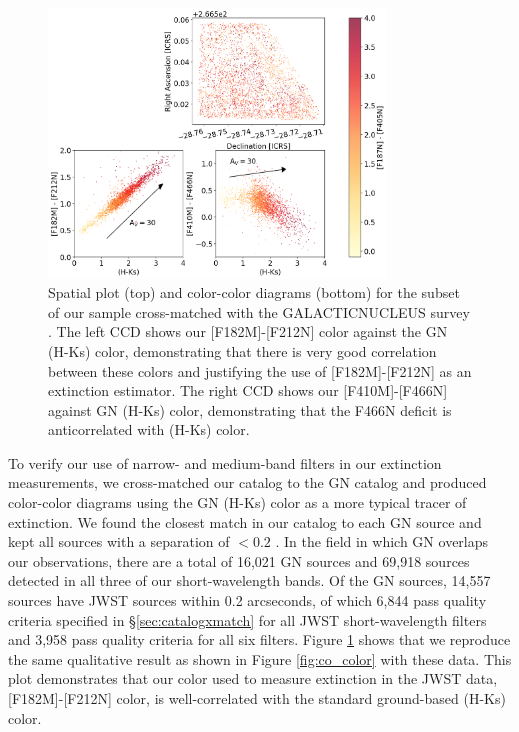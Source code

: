 \documentclass[times,astrosymb,twocolumn]{aastex631}
\def\rr#1{#1}
\begin{document}
\begin{figure}[!htp]
    \centering
    \includegraphics[width=0.8\textwidth]{figures/ColorColorDiagrams_WithSourceMap_ALL_GN.png}
    \caption{Spatial plot (top) and color-color diagrams (bottom) for the subset of our sample cross-matched with the GALACTICNUCLEUS survey \citep{Nogueras-Lara2021}.
    The left CCD shows our [F182M]-[F212N] color against the GN (H-Ks) color, demonstrating that there is very good correlation between these colors and justifying the use of [F182M]-[F212N] as an extinction estimator.
    The right CCD shows our [F410M]-[F466N] against GN (H-Ks) color, demonstrating that the F466N \rr{deficit} is anticorrelated with (H-Ks) color.
    }
    \label{fig:galnuc_ccd}
\end{figure}

To verify our use of narrow- and medium-band filters \rr{in our} extinction measurements, we cross-matched our catalog to the GN catalog and produced color-color diagrams using the GN (H-Ks) color as a more typical tracer of extinction.
We found the closest match in our catalog to each GN source and kept all sources with a separation of $<0.2$ \arcsec.
In the field in which GN overlaps our observations, there are a total of 16,021 GN sources and 69,918 sources detected in all three of our short-wavelength bands.
Of the GN sources, 14,557 sources have JWST sources within 0.2 arcseconds, of which 6,844 pass quality criteria specified in \S \ref{sec:catalogxmatch} for all JWST short-wavelength filters and 3,958 pass quality criteria for all six filters.
Figure \ref{fig:galnuc_ccd} shows that we reproduce the same qualitative result as shown in Figure \ref{fig:co_color} with these data.
This plot demonstrates that our color used to measure extinction in the JWST data, [F182M]-[F212N] color, is well-correlated with the standard ground-based (H-Ks) color.
\end{document}
